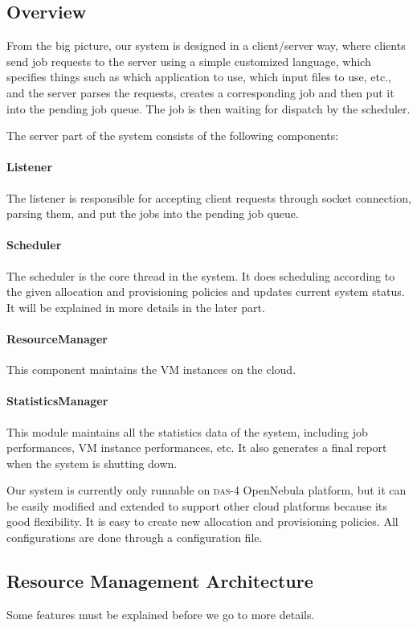 \subsection{Overview}
From the big picture, our system is designed in a client/server way,
where clients send job requests to the server using a simple
customized language, which specifies things such as which application
to use, which input files to use, etc., and the server parses the
requests, creates a corresponding job and then put it into the pending
job queue. The job is then waiting for dispatch by the scheduler.

The server part of the system consists of the following components:

\paragraph{Listener} 
The listener is responsible for accepting client requests through
socket connection, parsing them, and put the jobs into the pending job
queue.
\paragraph{Scheduler} 
The scheduler is the core thread in the system. It does scheduling
according to the given allocation and provisioning policies and
updates current system status. It will be explained in more details in
the later part.
\paragraph{ResourceManager} 
This component maintains the VM instances on the cloud.
\paragraph{StatisticsManager} 
This module maintains all the statistics data of the system, including
job performances, VM instance performances, etc. It also generates a
final report when the system is shutting down.

Our system is currently only runnable on \textsc{das-4} OpenNebula
platform, but it can be easily modified and extended to support other
cloud platforms because its good flexibility. It is easy to create new
allocation and provisioning policies. All configurations are done
through a configuration file.


\subsection{Resource Management Architecture}
Some features must be explained before we go to more details.

